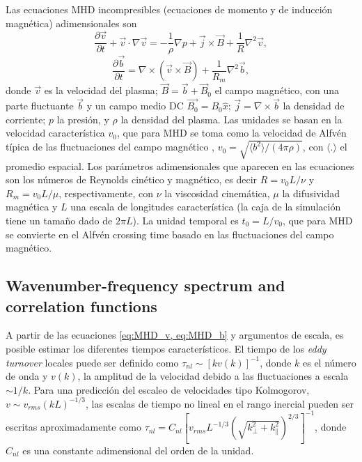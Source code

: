 Las ecuaciones MHD incompresibles (ecuaciones de momento y de
inducción magnética) adimensionales son
\begin{equation}\label{eq:MHD_v}
  \frac {\partial \vec{v}}{\partial t} +
  \vec{v }\cdot \nabla \vec{v} = -\frac{1}{\rho}\nabla p +
  \vec{j} \times \vec{B} + \frac{1}{R} \nabla^2\vec{v},
\end{equation}
\begin{equation}\label{eq:MHD_b}
  \frac{\partial \vec{b}}{\partial t} = \nabla \times (\vec{v} \times \vec{B})
  + \frac{1}{R_m} \nabla^2 \vec{b},
\end{equation}
donde $\vec{v}$ es la velocidad del plasma;
$\vec{B} = \vec{b} + \vec{B}_0$ el campo magnético, con una parte
fluctuante $\vec{b}$ y un campo medio DC $\vec{B_0}=B_0\hat{x}$;
$\vec{j} = \nabla \times \vec{b}$ la densidad de corriente; $p$ la
presión, y $\rho$ la densidad del plasma. Las unidades se basan en la
velocidad característica $v_0$, que para MHD se toma como la velocidad
de Alfvén típica de las fluctuaciones del campo magnético ,
$v_0 = \sqrt{\langle b^2 \rangle /(4\pi\rho)}$, con
$\langle . \rangle$ el promedio espacial. Los parámetros
adimensionales que aparecen en las ecuaciones son los números de
Reynolds cinético y magnético, es decir $R=v_0 L/\nu$ y
$R_m = v_0 L /\mu$, respectivamente, con $\nu$ la viscosidad
cinemática, $\mu$ la difusividad magnética y $L$ una escala de
longitudes característica (la caja de la simulación tiene un tamaño
dado de $2\pi L$). La unidad temporal es $t_0 = L/v_0$, que para MHD
se convierte en el {\color{red}Alfv\'en crossing time} basado en las
fluctuaciones del campo magnético.


\subsection{Wavenumber-frequency spectrum and correlation functions}\label{sec_Wfspectrum_and_Gamma}

A partir de las ecuaciones \cref{eq:MHD_v, eq:MHD_b} y argumentos de
escala, es posible estimar los diferentes tiempos característicos. El
tiempo de los \textit{eddy turnover} locales puede ser definido como
$\tau_{nl} \sim \left[ k v(k) \right]^{-1}$, donde $k$ es el número de
onda y $v(k)$, la amplitud de la velocidad debido a las fluctuaciones
a escala $\sim 1/k$. Para una predicción del escaleo de velocidades
tipo Kolmogorov, $v \sim v_{rms} \left(kL\right)^{-1/3}$, las escalas
de tiempo no lineal en el rango inercial pueden ser escritas
aproximadamente como
$\tau_{nl} = C_{nl} \left [ v_{rms} L^{-1/3} \left(\sqrt{k^2_\perp +
      k^2_\parallel}\right)^{2/3}\right ]^{-1}$, donde $C_{nl}$ es una
constante adimensional del orden de la unidad.

